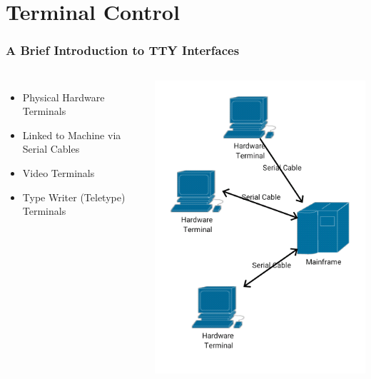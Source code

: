 \documentclass[handout]{beamer}
\begin{document}
\section{Terminal Control}
\begin{frame}
    \frametitle{A Brief Introduction to TTY Interfaces}
    \begin{columns}
       \begin{itemize}
           \item Physical Hardware Terminals
           \item Linked to Machine via Serial Cables
           \item Video Terminals
           \item Type Writer (Teletype) Terminals
       \end{itemize}
       
       \includegraphics[width=\textwidth]{images/ttyoldschool}
    \end{columns}
\end{frame}
\end{document}
